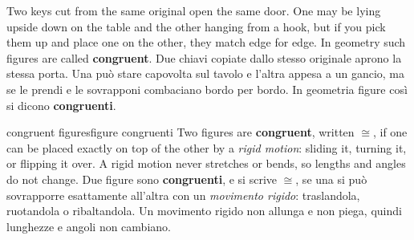 \label{ch:congruence}

\label{sec:congruent}
\begin{bi}
\colheads
Two keys cut from the same original open the same door. One may be lying upside down on the table and the other hanging from a hook, but if you pick them up and place one on the other, they match edge for edge. In geometry such figures are called \textbf{congruent}.
\IT
Due chiavi copiate dallo stesso originale aprono la stessa porta. Una può stare capovolta sul tavolo e l'altra appesa a un gancio, ma se le prendi e le sovrapponi combaciano bordo per bordo. In geometria figure così si dicono \textbf{congruenti}.
\end{bi}

\begin{defn}{congruent figures}{figure congruenti}
Two figures are \textbf{congruent}, written $\cong$, if one can be placed exactly on top of the other by a \emph{rigid motion}: sliding it, turning it, or flipping it over. A rigid motion never stretches or bends, so lengths and angles do not change.
\tcblower
Due figure sono \textbf{congruenti}, e si scrive $\cong$, se una si può sovrapporre esattamente all'altra con un \emph{movimento rigido}: traslandola, ruotandola o ribaltandola. Un movimento rigido non allunga e non piega, quindi lunghezze e angoli non cambiano.
\end{defn}

